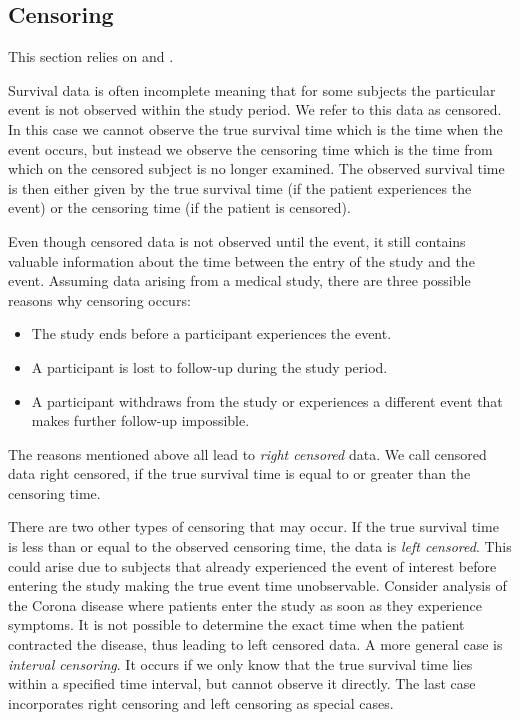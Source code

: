 \documentclass[12pt, a4paper]{scrartcl}
\theoremstyle{definition}
\theoremstyle{plain}
\numberwithin{equation}{section}
\numberwithin{figure}{section}
\numberwithin{table}{section}
\begin{document}
	\subsection{Censoring} \label{censoring}
	
	This section relies on \citet*{sabook} and \citet*{mathsabook}.
	
	Survival data is often incomplete meaning that for some subjects the particular event is not observed within the study period.
	We refer to this data as censored.
	In this case we cannot observe the true survival time which is the time when the event occurs, but instead we observe the censoring time which is the time from which on the censored subject is no longer examined.
	The observed survival time is then either given by the true survival time (if the patient experiences the event) or the censoring time (if the patient is censored).
	
	Even though censored data is not observed until the event, it still contains valuable information about the time between the entry of the study and the event.
	Assuming data arising from a medical study, there are three possible reasons why censoring occurs:
	\begin{itemize}
		\item The study ends before a participant experiences the event.
		\item A participant is lost to follow-up during the study period. %
		\item A participant withdraws from the study or experiences a different event that makes further follow-up impossible.
	\end{itemize}

	The reasons mentioned above all lead to \emph{right censored} data.
	We call censored data right censored, if the true survival time is equal to or greater than the censoring time.
	
	There are two other types of censoring that may occur.
	If the true survival time is less than or equal to the observed censoring time, the data is \emph{left censored}.
	This could arise due to subjects that already experienced the event of interest before entering the study making the true event time unobservable.
	Consider analysis of the Corona disease where patients enter the study as soon as they experience symptoms.
	It is not possible to determine the exact time when the patient contracted the disease, thus leading to left censored data.
	A more general case is \emph{interval censoring}.
	It occurs if we only know that the true survival time lies within a specified time interval, but cannot observe it directly.
	The last case incorporates right censoring and left censoring as special cases.
	
\end{document}
